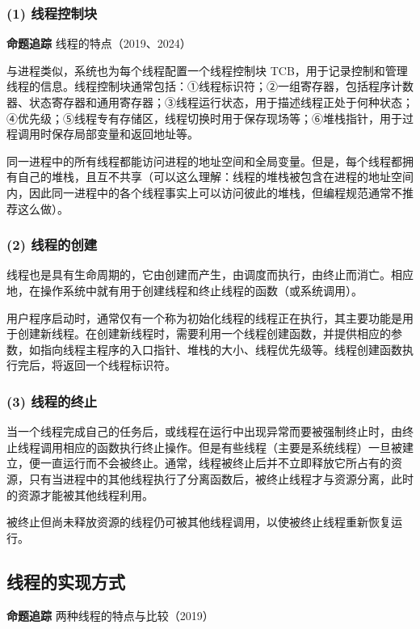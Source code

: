 \documentclass{ctexbook}
\begin{document}
	\subsubsection{(1) 线程控制块}
	
	\textbf{命题追踪} 线程的特点（2019、2024）
	
	与进程类似，系统也为每个线程配置一个线程控制块 TCB，用于记录控制和管理线程的信息。线程控制块通常包括：①线程标识符；②一组寄存器，包括程序计数器、状态寄存器和通用寄存器；③线程运行状态，用于描述线程正处于何种状态；④优先级；⑤线程专有存储区，线程切换时用于保存现场等；⑥堆栈指针，用于过程调用时保存局部变量和返回地址等。
	
	同一进程中的所有线程都能访问进程的地址空间和全局变量。但是，每个线程都拥有自己的堆栈，且互不共享（可以这么理解：线程的堆栈被包含在进程的地址空间内，因此同一进程中的各个线程事实上可以访问彼此的堆栈，但编程规范通常不推荐这么做）。
	
	\subsubsection{(2) 线程的创建}
	
	线程也是具有生命周期的，它由创建而产生，由调度而执行，由终止而消亡。相应地，在操作系统中就有用于创建线程和终止线程的函数（或系统调用）。
	
	用户程序启动时，通常仅有一个称为初始化线程的线程正在执行，其主要功能是用于创建新线程。在创建新线程时，需要利用一个线程创建函数，并提供相应的参数，如指向线程主程序的入口指针、堆栈的大小、线程优先级等。线程创建函数执行完后，将返回一个线程标识符。
	
	\subsubsection{(3) 线程的终止}
	
	当一个线程完成自己的任务后，或线程在运行中出现异常而要被强制终止时，由终止线程调用相应的函数执行终止操作。但是有些线程（主要是系统线程）一旦被建立，便一直运行而不会被终止。通常，线程被终止后并不立即释放它所占有的资源，只有当进程中的其他线程执行了分离函数后，被终止线程才与资源分离，此时的资源才能被其他线程利用。
	
	被终止但尚未释放资源的线程仍可被其他线程调用，以使被终止线程重新恢复运行。
	
	\subsection{线程的实现方式}
	
	\textbf{命题追踪} 两种线程的特点与比较（2019）
	
\end{document}

